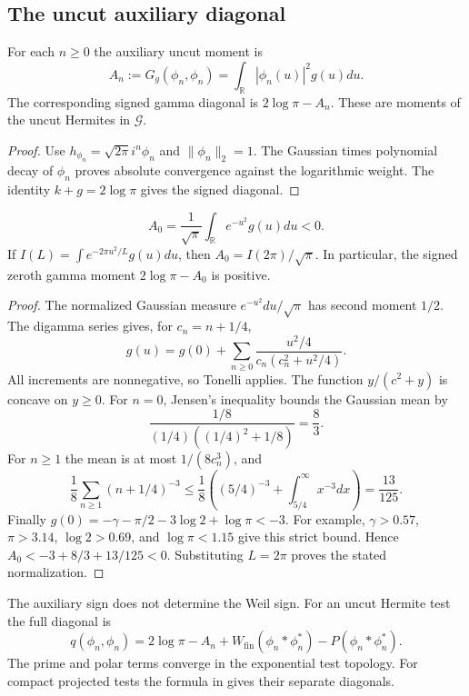 \subsection{The uncut auxiliary diagonal}
\label{v4-arith:w7-h:hermite-basis:arch-diagonal}
\begin{proposition}
\label{v4-arith:w7-h:prop:arch-diagonal}
For each $n\ge0$ the auxiliary uncut moment is
\begin{equation}
\label{v4-arith:w7-h:eq:arch-diagonal}
 A_n:=G_g(\phi_n,\phi_n)=\int_{\mathbb R}|\phi_n(u)|^2g(u)du.
\end{equation}
The corresponding signed gamma diagonal is $2\log\pi-A_n$.
These are moments of the uncut Hermites in $\mathscr G$.
\end{proposition}
\begin{proof}
Use $h_{\phi_n}=\sqrt{2\pi}i^n\phi_n$ and $\|\phi_n\|_2=1$.
The Gaussian times polynomial decay of $\phi_n$ proves absolute
convergence against the logarithmic weight. The identity
$k+g=2\log\pi$ gives the signed diagonal.
\end{proof}
\begin{lemma}
\label{v4-arith:w7-h:lem:arch-diagonal-sign}
\begin{equation}
\label{v4-arith:w7-h:eq:arch-00}
 A_0=\frac1{\sqrt\pi}\int_{\mathbb R}e^{-u^2}g(u)du<0.
\end{equation}
If $I(L)=\int e^{-2\pi u^2/L}g(u)du$, then
$A_0=I(2\pi)/\sqrt\pi$. In particular, the signed zeroth gamma
moment $2\log\pi-A_0$ is positive.
\end{lemma}
\begin{proof}
The normalized Gaussian measure $e^{-u^2}du/\sqrt\pi$ has second
moment $1/2$. The digamma series gives, for $c_n=n+1/4$,
\[
 g(u)=g(0)+\sum_{n\ge0}
       \frac{u^2/4}{c_n(c_n^2+u^2/4)}.
\]
All increments are nonnegative, so Tonelli applies.
The function $y/(c^2+y)$ is concave on $y\ge0$.
For $n=0$, Jensen's inequality bounds the Gaussian mean by
\[
 \frac{1/8}{(1/4)((1/4)^2+1/8)}=\frac83.
\]
For $n\ge1$ the mean is at most $1/(8c_n^3)$, and
\[
 \frac18\sum_{n\ge1}(n+1/4)^{-3}
 \le\frac18\left((5/4)^{-3}+\int_{5/4}^\infty x^{-3}dx\right)
 =\frac{13}{125}.
\]
Finally $g(0)=-\gamma-\pi/2-3\log2+\log\pi<-3$.
For example, $\gamma>0.57$, $\pi>3.14$, $\log2>0.69$, and
$\log\pi<1.15$ give this strict bound.
Hence $A_0<-3+8/3+13/125<0$.
Substituting $L=2\pi$ proves the stated normalization.
\end{proof}
\begin{remark}
\label{v4-arith:w7-h:rem:negative-is-necessary}
The auxiliary sign does not determine the Weil sign.
For an uncut Hermite test the full diagonal is
\[
 q(\phi_n,\phi_n)=2\log\pi-A_n
       +W_{\mathrm{fin}}(\phi_n*\phi_n^*)-P(\phi_n*\phi_n^*).
\]
The prime and polar terms converge in the exponential test topology.
For compact projected tests the formula in
 gives their separate diagonals.
\end{remark}

